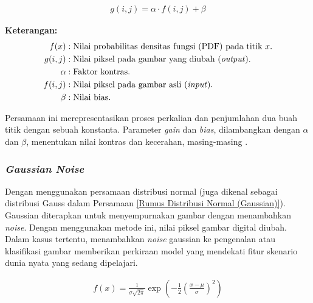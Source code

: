     \begin{equation}
      \begin{aligned} 
        g(i, j) = \alpha \cdot f(i, j) + \beta
        \end{aligned}\label{Augmentasi Nilai Kontras}
    \end{equation}


    \textbf{Keterangan:}
      \begin{align*}
        f(x) & : \text{Nilai probabilitas densitas fungsi (PDF) pada titik } x. \\
        g(i, j) & : \text{Nilai piksel pada gambar yang diubah (\textit{output})}. \\
        \alpha & : \text{Faktor kontras}. \\
         f(i, j) & : \text{Nilai piksel pada gambar asli (\textit{input})}.\\
         \beta & : \text{Nilai bias}.\\
    \end{align*}

    Persamaan ini merepresentasikan proses perkalian dan penjumlahan dua buah titik dengan sebuah konstanta. Parameter \textit{gain} dan \textit{bias}, dilambangkan dengan $\alpha$ dan  $\beta$, menentukan nilai kontras dan kecerahan, masing-masing \cite{Szeliski2021}.
    
\subsubsection{\textit{Gaussian Noise}}


     Dengan menggunakan persamaan distribusi normal (juga dikenal sebagai distribusi Gauss dalam Persamaan \ref{Rumus Distribusi Normal (Gaussian)}). Gaussian diterapkan untuk menyempurnakan gambar dengan menambahkan \textit{noise}. Dengan menggunakan metode ini, nilai piksel gambar digital diubah. Dalam kasus tertentu, menambahkan \textit{noise} gaussian ke pengenalan atau klasifikasi gambar memberikan perkiraan model yang mendekati fitur skenario dunia nyata yang sedang dipelajari.
 

    \begin{equation}
        \begin{aligned}
            f(x) = \frac{1}{\sigma \sqrt{2\pi}} \exp\left(-\frac{1}{2} \left(\frac{x - \mu}{\sigma}\right)^2\right)
        \end{aligned}\label{Rumus Distribusi Normal (Gaussian)}
    \end{equation}


